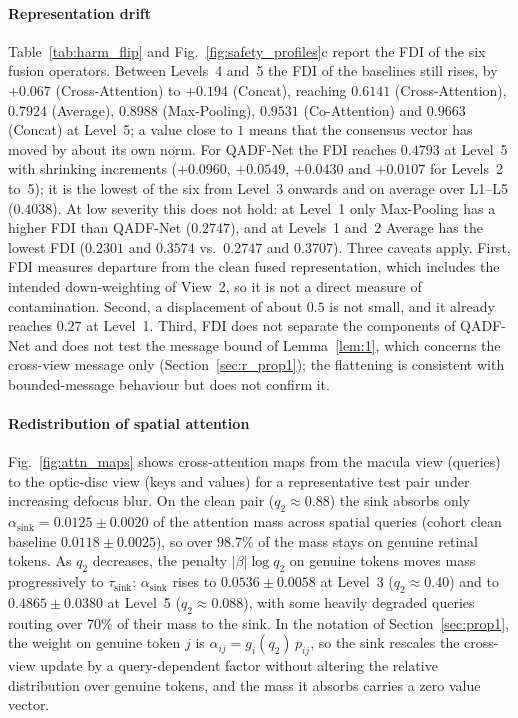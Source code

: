 \documentclass[final,5p,times,twocolumn,authoryear]{elsarticle}
\newcommand{\qadfnet}{QADF-Net}
\theoremstyle{plain}
\theoremstyle{remark}
\begin{document}
\paragraph{Representation drift} Table~\ref{tab:harm_flip} and Fig.~\ref{fig:safety_profiles}c report the FDI of the six fusion operators. Between Levels~4 and~5 the FDI of the baselines still rises, by $+0.067$ (Cross-Attention) to $+0.194$ (Concat), reaching $0.6141$ (Cross-Attention), $0.7924$ (Average), $0.8988$ (Max-Pooling), $0.9531$ (Co-Attention) and $0.9663$ (Concat) at Level~5; a value close to $1$ means that the consensus vector has moved by about its own norm. For \qadfnet{} the FDI reaches $0.4793$ at Level~5 with shrinking increments ($+0.0960$, $+0.0549$, $+0.0430$ and $+0.0107$ for Levels~2 to~5); it is the lowest of the six from Level~3 onwards and on average over L1--L5 ($0.4038$). At low severity this does not hold: at Level~1 only Max-Pooling has a higher FDI than \qadfnet{} ($0.2747$), and at Levels~1 and~2 Average has the lowest FDI ($0.2301$ and $0.3574$ vs.\ $0.2747$ and $0.3707$). Three caveats apply. First, FDI measures departure from the clean fused representation, which includes the intended down-weighting of View~2, so it is not a direct measure of contamination. Second, a displacement of about $0.5$ is not small, and it already reaches $0.27$ at Level~1. Third, FDI does not separate the components of \qadfnet{} and does not test the message bound of Lemma~\ref{lem:1}, which concerns the cross-view message only (Section~\ref{sec:r_prop1}); the flattening is consistent with bounded-message behaviour but does not confirm it.

\paragraph{Redistribution of spatial attention} Fig.~\ref{fig:attn_maps} shows cross-attention maps from the macula view (queries) to the optic-disc view (keys and values) for a representative test pair under increasing defocus blur. On the clean pair ($q_2 \approx 0.88$) the sink absorbs only $\alpha_{\text{sink}} = 0.0125 \pm 0.0020$ of the attention mass across spatial queries (cohort clean baseline $0.0118 \pm 0.0025$), so over $98.7\%$ of the mass stays on genuine retinal tokens. As $q_2$ decreases, the penalty $|\beta|\log q_2$ on genuine tokens moves mass progressively to $\tau_{\text{sink}}$: $\alpha_{\text{sink}}$ rises to $0.0536 \pm 0.0058$ at Level~3 ($q_2 \approx 0.40$) and to $0.4865 \pm 0.0380$ at Level~5 ($q_2 \approx 0.088$), with some heavily degraded queries routing over $70\%$ of their mass to the sink. In the notation of Section~\ref{sec:prop1}, the weight on genuine token $j$ is $\alpha_{ij}=g_i(q_2)\,p_{ij}$, so the sink rescales the cross-view update by a query-dependent factor without altering the relative distribution over genuine tokens, and the mass it absorbs carries a zero value vector.
\end{document}
